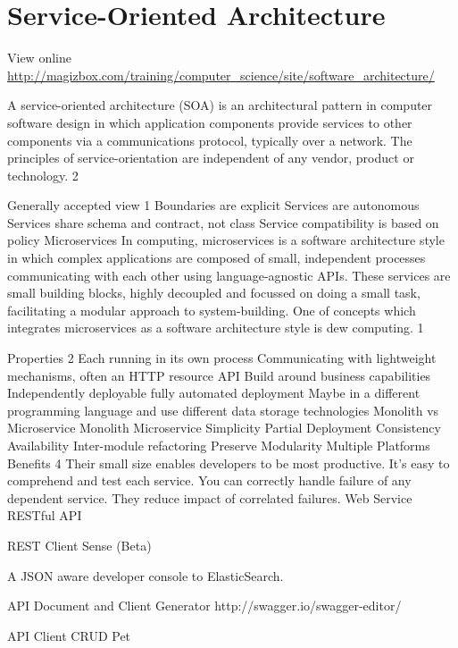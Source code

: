 \chapter{Service-Oriented Architecture}

View online \href{http://magizbox.com/training/computer_science/site/software_architecture/}{http://magizbox.com/training/computer_science/site/software_architecture/}

A service-oriented architecture (SOA) is an architectural pattern in computer software design in which application components provide services to other components via a communications protocol, typically over a network. The principles of service-orientation are independent of any vendor, product or technology. 2



Generally accepted view 1
Boundaries are explicit
Services are autonomous
Services share schema and contract, not class
Service compatibility is based on policy
Microservices
In computing, microservices is a software architecture style in which complex applications are composed of small, independent processes communicating with each other using language-agnostic APIs. These services are small building blocks, highly decoupled and focussed on doing a small task, facilitating a modular approach to system-building. One of concepts which integrates microservices as a software architecture style is dew computing. 1



Properties 2
Each running in its own process
Communicating with lightweight mechanisms, often an HTTP resource API
Build around business capabilities
Independently deployable
fully automated deployment
Maybe in a different programming language and use different data storage technologies
Monolith vs Microservice
Monolith	Microservice
Simplicity	Partial Deployment
Consistency	Availability
Inter-module refactoring	Preserve Modularity
Multiple Platforms
Benefits 4
Their small size enables developers to be most productive.
It's easy to comprehend and test each service.
You can correctly handle failure of any dependent service.
They reduce impact of correlated failures.
Web Service
RESTful API


REST Client
Sense (Beta)

A JSON aware developer console to ElasticSearch.

API Document and Client Generator
http://swagger.io/swagger-editor/

API Client
CRUD Pet

